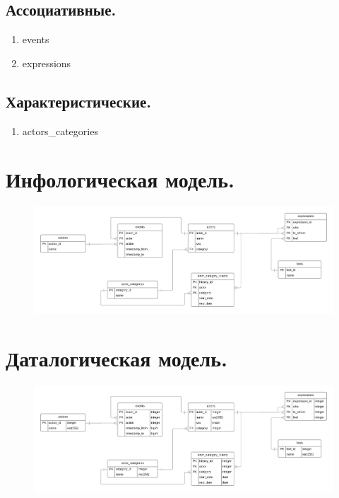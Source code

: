 \subsection{Ассоциативные.}

\begin{enumerate}
    \item events
    \item expressions
\end{enumerate}

\subsection{Характеристические.}

\begin{enumerate}
    \item actors_categories
\end{enumerate}

\section{Инфологическая модель.}
\begin{figure}[H]
	\centering
	\includegraphics[scale=0.15]{img/info_model}
\end{figure}

\section{Даталогическая модель.}
\begin{figure}[H]
	\centering
	\includegraphics[scale=0.15]{img/data_model}
\end{figure}

